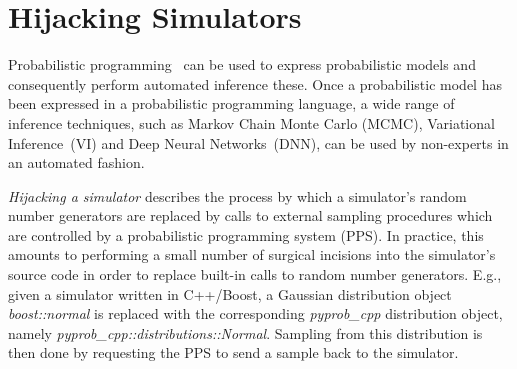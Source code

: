 \documentclass{article}
\begin{document}





\section{Hijacking Simulators}
\label{sec:hijackingsimulators}

 Probabilistic programming~\cite{gordon2014probabilistic,staton2016semantics,kozen1979semantics} 
can be used to express probabilistic models and consequently perform automated inference these. Once a probabilistic model has been expressed in a probabilistic programming language, a wide range of inference techniques, such as Markov Chain Monte Carlo (MCMC)\cite{}, Variational Inference~(VI)\cite{} and Deep Neural Networks~(DNN)\cite{},  can be used by non-experts in an automated fashion. 
 
\textit{Hijacking a simulator} describes the process by which a simulator's random number generators are replaced by calls to external sampling procedures which are controlled by a probabilistic programming system (PPS). In practice, this amounts to performing a small number of surgical incisions into the simulator's source code in order to replace built-in calls to random number generators. E.g., given a simulator written in C++/Boost\cite{}, a Gaussian distribution object \textit{boost::normal} is replaced with the corresponding \textit{pyprob\_cpp} distribution object, namely \textit{pyprob\_cpp::distributions::Normal}. Sampling from this distribution is then done by requesting the PPS to send a sample back to the simulator.
\end{document}
